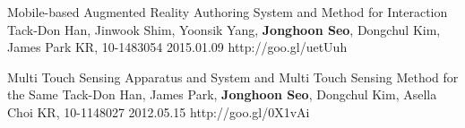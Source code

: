 \begin{cventries}
  \cvpatententry
    {Mobile-based Augmented Reality Authoring System and Method for Interaction} %
    {Tack-Don Han, Jinwook Shim, Yoonsik Yang, \textbf{Jonghoon Seo}, Dongchul Kim, James Park} %
    {KR, 10-1483054} %
    {2015.01.09} %
    {http://goo.gl/uetUuh}

  \cvpatententry
    {Multi Touch Sensing Apparatus and System and Multi Touch Sensing Method for the Same} %
    {Tack-Don Han, James Park, \textbf{Jonghoon Seo}, Dongchul Kim, Asella Choi} %
    {KR, 10-1148027} %
    {2012.05.15} %
    {http://goo.gl/0X1vAi}
\end{cventries}